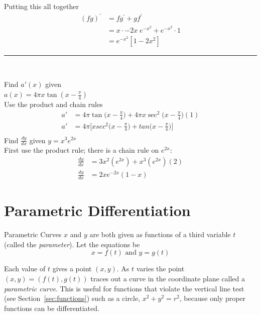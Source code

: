 Putting this all together
\begin{align*}\left (f g\right )^{ \prime } &  = f g^{ \prime } +g f^{ \prime } \\
 &  = x \cdot  -2 x\; e^{ -x^{2}} +e^{ -x^{2}} \cdot 1 \\
 &  = e^{ -x^{2}} \left [1 -2 x^{2}\right ]\end{align*}
\rule{6.8cm}{0.5pt}\\
\begin{multicols}{2}
\example Find $a'(x)$ given \\$a(x)= 4\pi x\tan (x-\frac{\pi}{4})$\medskip\\
\solution Use the product and chain rules \\
	\begin{align*}
	a'&= 4\pi\tan\big(x-\frac{\pi}{4}\big)+4\pi x\sec^2\big(x-\frac{\pi}{4}\big)(1) \\
	a'&= 4\pi\Big[xsec^2\big(x-\frac{\pi}{4}\big)+tan\big(x-\frac{\pi}{4}\big)\Big] \\
	\end{align*}
\examq Find $\frac{dy}{dx}$ given $y=x^3e^{2x}$\medskip\\
\solution First use the product rule; there is a chain rule on 		$e^{2x}$:\begin{align*}\frac{dy}{dx}&=3x^2(e^{2x})+x^3(e^{2x})(2) \\
	\frac{dy}{dx}&=2xe^{-2x}(1-x)\end{align*}
\end{multicols}

\section{Parametric Differentiation}
Parametric Curves $x$ and $y$ are both given as functions of a third variable $t$ (called the \emph{parameter}). Let the equations be
\begin{equation*}x =f (t)\text{ and }y =g (t)
\end{equation*}

Each value of $t$ gives a point $(x ,y)$. As $t$ varies the point $(x ,y) =(f (t) ,g (t))$ traces out a curve in the coordinate plane called a \emph{parametric curve}. This is useful for functions that violate the vertical line test (see Section~\ref{sec:functions}) such as a circle, $x^2+y^2=r^2$, because only proper functions can be differentiated.

